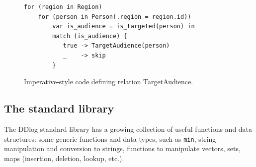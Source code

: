 \begin{figure}[t]
  \small
  \begin{lstlisting}[language=ddlog]
for (region in Region) 
    for (person in Person(.region = region.id))
        var is_audience = is_targeted(person) in
        match (is_audience) {
           true -> TargetAudience(person)
           _    -> skip
        }    
  \end{lstlisting}
  \caption{Imperative-style code defining relation TargetAudience.\label{fig:imperative}}
\end{figure}

\subsection{The standard library}

The DDlog standard library has a growing collection of useful
functions and data structures: some generic functions and data-types,
such as \texttt{min}, string manipulation and conversion to strings,
functions to manipulate vectors, sets, maps (insertion, deletion,
lookup, etc.).
